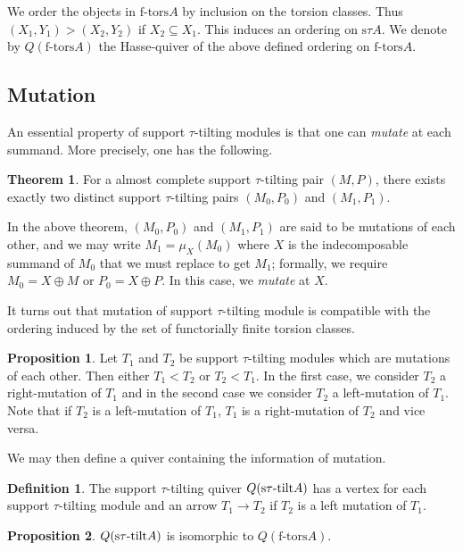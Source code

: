 \documentclass[]{article}
\theoremstyle{definition}
\newtheorem{definition}{Definition}[section]
\newtheorem{theorem}{Theorem}[section]
\newtheorem{proposition}{Proposition}[section]
\newcommand{\tu}{\ensuremath{\tau}}
\begin{document}
We order the objects in $\text{f-tors} A$ by inclusion on the torsion classes. Thus $(X_1,Y_1) > (X_2,Y_2)$ if $X_2 \subseteq X_1$. This induces an ordering on $\text{s}\tu A$. We denote by $Q(\text{f-tors} A)$ the Hasse-quiver of the above defined ordering on $\text{f-tors} A$.

\subsection{Mutation}
An essential property of support \tu-tilting modules is that one can \textit{mutate} at each summand. More precisely, one has the following.

\begin{theorem}
	For a almost complete support $\tau$-tilting pair $(M,P)$, there exists exactly two distinct support \tu-tilting pairs $(M_0,P_0)$ and $(M_1,P_1)$.
\end{theorem}

In the above theorem, $(M_0,P_0)$ and $(M_1,P_1)$ are said to be mutations of each other, and we may write $M_1 = \mu_X(M_0)$ where $X$ is the indecomposable summand of $M_0$ that we must replace to get $M_1$; formally, we require $M_0 = X \oplus M$ or $P_0 = X \oplus P$. In this case, we \textit{mutate} at $X$.

It turns out that mutation of support \tu-tilting module is compatible with the ordering induced by the set of functorially finite torsion classes.

\begin{proposition}\cite[Definition-Proposition 2.28]{tau}
	Let $T_1$ and $T_2$ be support \tu-tilting modules which are mutations of each other. Then either $T_1 < T_2$ or $T_ 2 < T_1$. In the first case, we consider $T_2$ a right-mutation of $T_1$ and in the second case we consider $T_2$ a left-mutation of $T_1$. Note that if $T_2$ is a left-mutation of $T_1$, $T_1$ is a right-mutation of $T_2$ and vice versa.
\end{proposition}

We may then define a quiver containing the information of mutation.

\begin{definition}
	The support $\tau$-tilting quiver $Q(\text{s\tu-tilt} A)$ has a vertex for each support \tu-tilting module and an arrow $T_1 \to T_2$ if $T_2$ is a left mutation of $T_1$. 
\end{definition}

\begin{proposition}
	$Q(\text{s\tu-tilt} A)$ is isomorphic to $Q(\text{f-tors} A)$.
\end{proposition}
\end{document}
